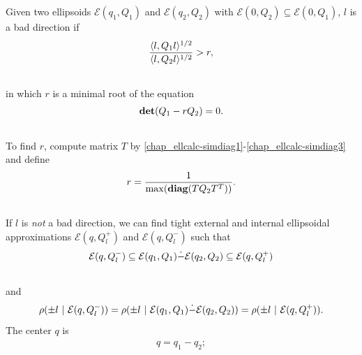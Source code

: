 \documentclass[letterpaper,10pt,english]{sphinxmanual}
\begin{document}
Given two ellipsoids ${\mathcal E}(q_1,Q_1)$ and
${\mathcal E}(q_2,Q_2)$ with
${\mathcal E}(0,Q_2)\subseteq{\mathcal E}(0,Q_1)$, $l$ is a
bad direction if
\begin{gather}
\begin{split}\frac{\langle l,Q_1l\rangle^{1/2}}{\langle l,Q_2l\rangle^{1/2}}>r,\end{split}\notag\\\begin{split}\end{split}\notag
\end{gather}
in which $r$ is a minimal root of the equation
\begin{gather}
\begin{split}{\bf det}(Q_1-rQ_2) = 0.\end{split}\notag\\\begin{split}\end{split}\notag
\end{gather}
To find $r$, compute matrix $T$ by \eqref{chap_ellcalc-simdiag1}-\eqref{chap_ellcalc-simdiag3}
and define
\begin{gather}
\begin{split}r = \frac{1}{\max({\bf diag}(TQ_2T^T))}.\end{split}\notag\\\begin{split}\end{split}\notag
\end{gather}
If $l$ is \emph{not} a bad direction, we can find tight external and
internal ellipsoidal approximations ${\mathcal E}(q,Q^+_l)$ and
${\mathcal E}(q,Q^-_l)$ such that
\begin{gather}
\begin{split}{\mathcal E}(q,Q^-_l)\subseteq{\mathcal E}(q_1,Q_1)\dot{-}{\mathcal E}(q_2,Q_2)\subseteq{\mathcal E}(q,Q^+_l)\end{split}\notag\\\begin{split}\end{split}\notag
\end{gather}
and
\begin{gather}
\begin{split}\rho(\pm l ~|~ {\mathcal E}(q,Q_l^-)) =
\rho(\pm l ~|~ {\mathcal E}(q_1,Q_1)\dot{-}{\mathcal E}(q_2,Q_2)) =
\rho(\pm l ~|~ {\mathcal E}(q,Q_l^+)).\end{split}\notag
\end{gather}
The center $q$ is
\label{chap_ellcalc:equation-minkdiff_c}\begin{gather}
\begin{split}q = q_1 - q_2;\end{split}\label{chap_ellcalc-minkdiff_c}
\end{gather}
\end{document}
